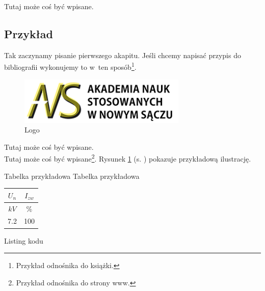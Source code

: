 \hspace{0.60cm}Tutaj może coś być wpisane.

\subsection{Przykład}  %

\hspace{0.60cm}Tak zaczynamy pisanie pierwszego akapitu. Jeśli chcemy napisać przypis do bibliografii wykonujemy to w~ten sposób\footnote{Przykład odnośnika do książki\cite{legierski}.}.

\begin{figure}[!htb]
  \begin{center}
    \includegraphics[width=8cm]{rys/ans.png}
    \caption{Logo}
    \label{rys:rysunek001}
  \end{center}
\end{figure}


Tutaj może coś być wpisane. \\Tutaj może coś być wpisane\footnote{Przykład odnośnika do strony www\cite{www1}.}.
Rysunek \ref{rys:rysunek001} (s. \pageref{rys:rysunek001}) pokazuje przykładową ilustrację.

\begin{tabela}
  {Tabelka przykładowa}	%
  {Tabelka przykładowa}	%
  {
    \begin{tabular}{|c|c|} \hline
      $U_n$ & $I_{zw}$ \\ \hline
      $kV$  & $\%$     \\ \hline
      7.2   & 100      \\ \hline
    \end{tabular}
  }
  \label{tab:tablica001}
\end{tabela}


Listing kodu


